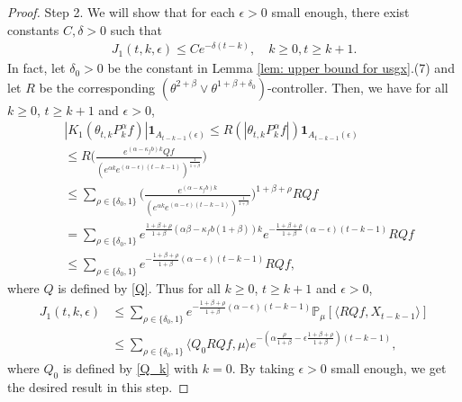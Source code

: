 \documentclass[12pt,a4paper]{amsart}
\theoremstyle{plain}
\theoremstyle{definition}
\numberwithin{equation}{section}
\begin{document}
\begin{proof}
Step 2.  We will show that for each $\epsilon>0$ small enough, there exist constants $C, \delta>0$ such that
    \begin{equation}\begin{split}
    \label{lemma31q}
      J_1(t,k,\epsilon)
      \leq Ce^{-\delta (t-k)},
      \quad k\geq 0, t\geq k+1.
    \end{split}\end{equation}
    In fact, let $\delta_0 >0$ be the constant in Lemma \ref{lem: upper bound for usgx}.(7) and let $R$ be the corresponding $(\theta^{2+\beta}\vee \theta^{1+\beta+\delta_0})$-controller.
    Then, we have for all $k\geq 0$, $t\geq k+1$ and $\epsilon> 0$,
\begin{equation}\begin{split}
   & |K_1(\theta_{t,k}P^\alpha_k f)|\mathbf{1}_{A_{t-k-1}(\epsilon)}
   \leq R(|\theta_{t,k}P^\alpha_k f|)\mathbf{1}_{A_{t-k-1}(\epsilon)}
   \\&\leq R \Big(\frac{e^{(\alpha-\kappa_fb)k} Qf}{(e^{\alpha k}e^{(\alpha-\epsilon)(t-k-1)})^\frac{1}{1+\beta}}\Big)
   \\&\leq \sum_{\rho \in \{\delta_0, 1\}}\Big(\frac{e^{(\alpha-\kappa_fb)k}}{(e^{\alpha k}e^{(\alpha-\epsilon)(t-k-1)})^\frac{1}{1+\beta}}\Big)^{1+\beta+ \rho} RQf
   \\&=\sum_{\rho \in \{\delta_0, 1\}}e^{\frac{1+\beta + \rho}{1+\beta}(\alpha\beta-\kappa_fb(1+\beta))k}e^{-\frac{1+\beta+\rho}{1+\beta} (\alpha-\epsilon)(t-k-1)}RQf
   \\&\leq \sum_{\rho \in \{\delta_0,1\}}e^{-\frac{1+\beta+\rho}{1+\beta}(\alpha-\epsilon)(t-k-1)}RQf,
\end{split}\end{equation}
where $Q$ is defined by \eqref{Q}.
Thus for all $k\geq 0$, $t\geq k+1$ and $\epsilon> 0$,
\begin{equation}\begin{split}
\label{eq: estimate of J1}
     J_1(t,k,\epsilon)&
     \leq \sum_{\rho \in \{\delta_0,1\}}e^{-\frac{1+\beta+\rho}{1+\beta}(\alpha-\epsilon)(t-k-1)}\mathbb{P}_{\mu}[\langle RQf,X_{t-k-1}\rangle]\\
     & \leq \sum_{\rho \in \{\delta_0,1\}} \langle Q_0 RQf, \mu \rangle e^{-(\alpha\frac{\rho}{1+\beta}-\epsilon\frac{1+\beta+\rho}{1+\beta})(t-k-1)},
\end{split}\end{equation}
where $Q_0$ is defined by \eqref{Q_k} with $k=0$.
    By taking $\epsilon>0$ small enough, we get the desired result in this step.


\end{proof}
\end{document}
